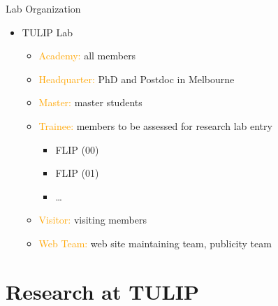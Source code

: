 \documentclass[
 size=14pt,
 paper=smartboard,  %
 mode=present, 		%
 display=slides, 	%
 style=tuliplab,  	%
 pauseslide,
 fleqn,leqno]{powerdot}
\begin{document}
\begin{slide}{Lab Organization}
\begin{itemize}
  \item TULIP Lab
  \begin{itemize}
    \item \textcolor{orange}{Academy:} all members
    \item \textcolor{orange}{Headquarter:} PhD and Postdoc in Melbourne
    \item \textcolor{orange}{Master:} master students
    \item \textcolor{orange}{Trainee:} members to be assessed for research lab entry
        \begin{itemize}
          \item FLIP (00)
          \item FLIP (01)
          \item \dots
        \end{itemize}
    \item \textcolor{orange}{Visitor:} visiting members
    \item \textcolor{orange}{Web Team:} web site maintaining team, publicity team
  \end{itemize}
\end{itemize}

\end{slide}


\section{Research at TULIP}
\end{document}
